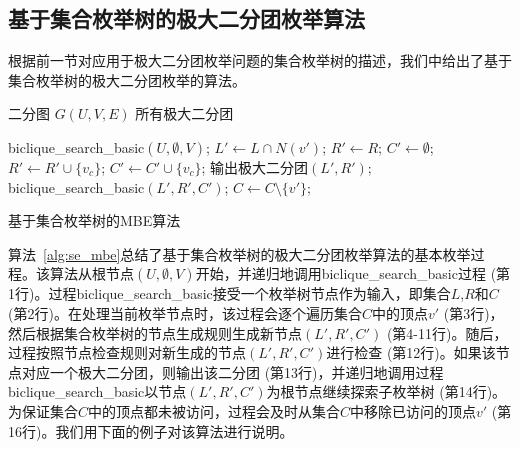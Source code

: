 \subsection{基于集合枚举树的极大二分团枚举算法}
根据前一节对应用于极大二分团枚举问题的集合枚举树的描述，我们中给出了基于集合枚举树的极大二分团枚举的算法。

\begin{algorithm}[H]
    \begin{algorithmic}[1]
        \normalsize
        \REQUIRE 二分图 $G(U,V,E)$
        \ENSURE 所有极大二分团
        
        \renewcommand{\algorithmicwhile}{\textbf{procedure}}
        \renewcommand{\algorithmicdo}{\textbf{:}}


        \STATE \textsf{biclique\_search\_basic}$(U,\emptyset,V)$;
        \renewcommand{\algorithmicdo}{\textbf{do}}
            \STATE $L' \leftarrow L \cap N(v')$; $R'\leftarrow R$; $C' \leftarrow \emptyset$;
                \STATE $R' \leftarrow R' \cup \{v_c\}$;
                \STATE $C' \leftarrow C' \cup \{v_c\}$;
              \ENDIF
            \ENDFOR
              \STATE 输出极大二分团$(L', R')$;
              \STATE \textsf{biclique\_search\_basic}$(L',R',C')$;
            \ENDIF
            \STATE $C \leftarrow C \setminus \{v'\}; $
          \ENDFOR

        \ENDWHILE

    \end{algorithmic}
    \caption{\label{alg:se_mbe}基于集合枚举树的MBE算法}
\end{algorithm}

算法~\ref{alg:se_mbe}总结了基于集合枚举树的极大二分团枚举算法的基本枚举过程。该算法从根节点$(U,\emptyset,V)$开始，并递归地调用\textsf{biclique\_search\_basic}过程 (第1行)。过程\textsf{biclique\_search\_basic}接受一个枚举树节点作为输入，即集合$L$,$R$和$C$ (第2行)。在处理当前枚举节点时，该过程会逐个遍历集合$C$中的顶点$v'$ (第3行)，然后根据集合枚举树的节点生成规则生成新节点$(L',R',C')$ (第4-11行)。随后，过程按照节点检查规则对新生成的节点$(L',R',C')$进行检查 (第12行)。如果该节点对应一个极大二分团，则输出该二分团 (第13行)，并递归地调用过程\textsf{biclique\_search\_basic}以节点$(L',R',C')$为根节点继续探索子枚举树 (第14行)。为保证集合$C$中的顶点都未被访问，过程会及时从集合$C$中移除已访问的顶点$v'$ (第16行)。我们用下面的例子对该算法进行说明。


